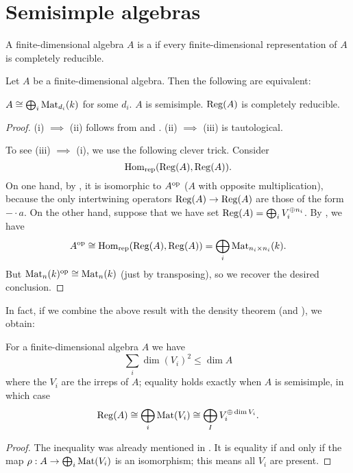 \section{Semisimple algebras}

\begin{definition}
	A finite-dimensional algebra $A$ is a 
	if every finite-dimensional representation of $A$ is completely reducible.
\end{definition}

\begin{theorem}
	Let $A$ be a finite-dimensional algebra.
	Then the following are equivalent:
	\begin{enumerate}[(i)]
		\ii $A \cong \bigoplus_i \mathrm{Mat}_{d_i}(k)$ for some $d_i$.
		\ii $A$ is semisimple.
		\ii $\operatorname{Reg}(A)$ is completely reducible.
	\end{enumerate}
\end{theorem}
\begin{proof}
	(i) $\implies$ (ii) follows
	from  and .
	(ii) $\implies$ (iii) is tautological.

	To see (iii) $\implies$ (i), we use the following clever trick.
	Consider
	\[ \operatorname{Hom}_{\mathrm{rep}}(\operatorname{Reg}(A), \operatorname{Reg}(A)). \]
	On one hand, by ,
	it is isomorphic to $A^{\mathrm{op}}$ ($A$ with opposite multiplication),
	because the only intertwining operators $\operatorname{Reg}(A) \to \operatorname{Reg}(A)$
	are those of the form $- \cdot a$.
	On the other hand, suppose that we have set
	$ \operatorname{Reg}(A) = \bigoplus_i V_i^{\oplus n_i} $.
	By , we have
	\[ A^{\mathrm{op}} \cong \operatorname{Hom}_{\mathrm{rep}}(\operatorname{Reg}(A), \operatorname{Reg}(A))
		= \bigoplus_i \mathrm{Mat}_{n_i \times n_i}(k). \]
	But $\mathrm{Mat}_n(k)^{\mathrm{op}} \cong \mathrm{Mat}_n(k)$ (just by transposing),
	so we recover the desired conclusion.
\end{proof}

In fact, if we combine the above result with
the density theorem (and ), we obtain:
\begin{theorem}
	For a finite-dimensional algebra $A$ we have
	\[ \sum_{i} \dim(V_i)^2 \le \dim A \]
	where the $V_i$ are the irreps of $A$;
	equality holds exactly when $A$ is semisimple,
	in which case 
	\[ \operatorname{Reg}(A) \cong \bigoplus_i \mathrm{Mat}(V_i)
		\cong \bigoplus_I V_i^{\oplus \dim V_i}. \]
\end{theorem}
\begin{proof}
	The inequality was already mentioned in .
	It is equality if and only if the map $\rho : A \to \bigoplus_i \mathrm{Mat}(V_i)$
	is an isomorphism; this means all $V_i$ are present.
\end{proof}

